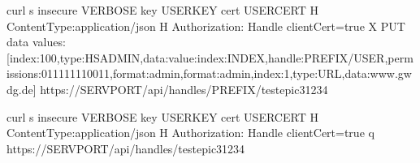 \documentclass[a4paper,10pt,english]{sphinxmanual}
\begin{document}
\sphinxAtStartPar
{}

\begin{sphinxVerbatim}[commandchars=\\\{\}]
curl \PYGZhy{}s \PYGZhy{}\PYGZhy{}insecure \PYGZdl{}\PYGZob{}VERBOSE\PYGZcb{} \PYGZhy{}\PYGZhy{}key \PYGZdl{}\PYGZob{}USERKEY\PYGZcb{} \PYGZhy{}\PYGZhy{}cert \PYGZdl{}\PYGZob{}USERCERT\PYGZcb{} \PYGZhy{}H \PYGZdq{}Content\PYGZhy{}Type:application/json\PYGZdq{} \PYGZhy{}H \PYGZsq{}Authorization: Handle clientCert=\PYGZdq{}true\PYGZdq{}\PYGZsq{} \PYGZhy{}X PUT \PYGZhy{}\PYGZhy{}data  \PYGZsq{}\PYGZob{}\PYGZdq{}values\PYGZdq{}:[\PYGZob{}\PYGZdq{}index\PYGZdq{}:100,\PYGZdq{}type\PYGZdq{}:\PYGZdq{}HS\PYGZus{}ADMIN\PYGZdq{},\PYGZdq{}data\PYGZdq{}:\PYGZob{}\PYGZdq{}value\PYGZdq{}:\PYGZob{}\PYGZdq{}index\PYGZdq{}:\PYGZsq{}\PYGZdl{}\PYGZob{}INDEX\PYGZcb{}\PYGZsq{},\PYGZdq{}handle\PYGZdq{}:\PYGZdq{}\PYGZsq{}\PYGZdl{}\PYGZob{}PREFIX\PYGZcb{}\PYGZsq{}\PYGZbs{}/\PYGZsq{}\PYGZdl{}\PYGZob{}USER\PYGZcb{}\PYGZsq{}\PYGZdq{},\PYGZdq{}permissions\PYGZdq{}:\PYGZdq{}011111110011\PYGZdq{},\PYGZdq{}format\PYGZdq{}:\PYGZdq{}admin\PYGZdq{}\PYGZcb{},\PYGZdq{}format\PYGZdq{}:\PYGZdq{}admin\PYGZdq{}\PYGZcb{}\PYGZcb{},\PYGZob{}\PYGZdq{}index\PYGZdq{}:1,\PYGZdq{}type\PYGZdq{}:\PYGZdq{}URL\PYGZdq{},\PYGZdq{}data\PYGZdq{}:\PYGZdq{}www.gwdg.de\PYGZdq{}\PYGZcb{}]\PYGZcb{}\PYGZsq{} https://\PYGZdl{}\PYGZob{}SERVPORT\PYGZcb{}/api/handles/\PYGZdl{}\PYGZob{}PREFIX\PYGZcb{}/test\PYGZus{}epic3\PYGZus{}1234
\end{sphinxVerbatim}

\sphinxAtStartPar
{}

\begin{sphinxVerbatim}[commandchars=\\\{\}]
curl \PYGZhy{}s \PYGZhy{}\PYGZhy{}insecure \PYGZdl{}\PYGZob{}VERBOSE\PYGZcb{} \PYGZhy{}\PYGZhy{}key \PYGZdl{}\PYGZob{}USERKEY\PYGZcb{} \PYGZhy{}\PYGZhy{}cert \PYGZdl{}\PYGZob{}USERCERT\PYGZcb{} \PYGZhy{}H \PYGZdq{}Content\PYGZhy{}Type:application/json\PYGZdq{} \PYGZhy{}H \PYGZsq{}Authorization: Handle clientCert=\PYGZdq{}true\PYGZdq{}\PYGZsq{} \PYGZhy{}q https://\PYGZdl{}\PYGZob{}SERVPORT\PYGZcb{}/api/handles/test\PYGZus{}epic3\PYGZus{}1234
\end{sphinxVerbatim}

\sphinxAtStartPar
{}
\end{document}
